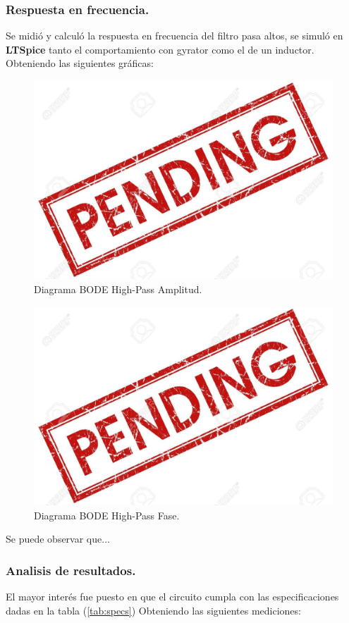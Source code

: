 \documentclass[a4paper]{article}
\begin{document}
\subsubsection{Respuesta en frecuencia.}
Se midió y calculó la respuesta en frecuencia del filtro pasa altos, se simuló en \textbf{LTSpice}  tanto el comportamiento con gyrator como el de un inductor. Obteniendo las siguientes gráficas:
\begin{figure}[H]	
	\centering
	\includegraphics[width=\textwidth]{ImagenesEj2/bodehp.jpg}
	\caption{Diagrama BODE High-Pass Amplitud.}
	\label{fig:bodehp}
\end{figure}
\begin{figure}[H]	
	\centering
	\includegraphics[width=\textwidth]{ImagenesEj2/bodehpp.jpg}
	\caption{Diagrama BODE High-Pass Fase.}
	\label{fig:bodehpp}
\end{figure}
Se puede observar que...
\subsubsection{Analisis de resultados.}
El mayor interés fue puesto en que el circuito cumpla con las especificaciones dadas en la tabla (\ref{tab:specs})
Obteniendo las siguientes mediciones:
\end{document}
